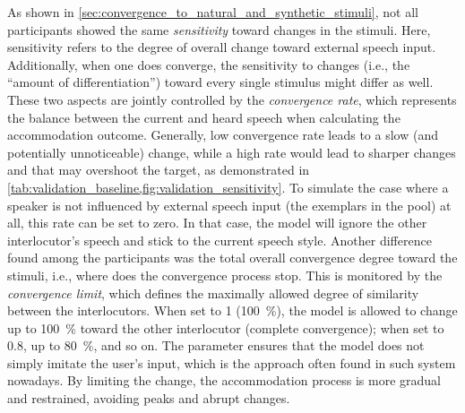 As shown in \cref{sec:convergence_to_natural_and_synthetic_stimuli}, not all participants showed the same \emph{sensitivity} toward changes in the stimuli.
Here, sensitivity refers to the degree of overall change toward external speech input.
Additionally, when one does converge, the sensitivity to changes (i.e., the \enquote{amount of differentiation}) toward every single stimulus might differ as well.
These two aspects are jointly controlled by the \emph{convergence rate}, which represents the balance between the current and heard speech when calculating the accommodation outcome.
Generally, low convergence rate leads to a slow (and potentially unnoticeable) change, while a high rate would lead to sharper changes and that may overshoot the target, as demonstrated in \cref{tab:validation_baseline,fig:validation_sensitivity}.
To simulate the case where a speaker is not influenced by external speech input (the exemplars in the pool) at all, this rate can be set to zero.
In that case, the model will ignore the other interlocutor's speech and stick to the current speech style.
Another difference found among the participants was the total overall convergence degree toward the stimuli, i.e., where does the convergence process stop.
This is monitored by the \emph{convergence limit}, which defines the maximally allowed degree of similarity between the interlocutors.
When set to 1 (\SI{100}{\percent}), the model is allowed to change up to \SI{100}{\percent} toward the other interlocutor (complete convergence); when set to 0.8, up to \SI{80}{\percent}, and so on.
The parameter ensures that the model does not simply imitate the user's input, which is the approach often found in such system nowadays.
By limiting the change, the accommodation process is more gradual and restrained, avoiding peaks and abrupt changes.

